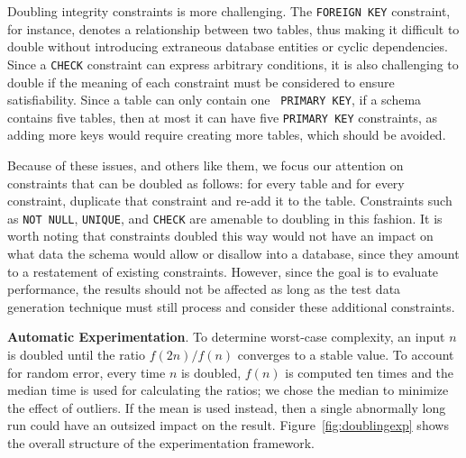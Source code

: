 

  Doubling integrity constraints is more challenging.  The {\tt FOREIGN KEY} constraint, for instance, denotes a relationship
  between two tables, thus making it difficult to double without introducing extraneous database entities or cyclic
  dependencies.  Since a {\tt CHECK} constraint can express arbitrary conditions, it is also challenging to double if the
  meaning of each constraint must be considered to ensure satisfiability.  Since a table can only contain one {\tt
  PRIMARY KEY}, if a schema contains five tables, then at most it can have five {\tt PRIMARY KEY} constraints, as adding more
  keys would require creating more tables, which should be avoided.




  Because of these issues, and others like them, we focus our attention on constraints that can be doubled as follows:
  for every table and for every constraint, duplicate that constraint and re-add it to the table.  Constraints such as
  {\tt NOT NULL}, {\tt UNIQUE}, and {\tt CHECK} are amenable to doubling in this fashion.  It is worth noting that
  constraints doubled this way would not have an impact on what data the schema would allow or disallow into a database,
  since they amount to a restatement of existing constraints.  However, since the goal is to evaluate performance, the
  results should not be affected as long as the test data generation technique must still process and consider these
  additional constraints.

  \textbf{Automatic Experimentation}. To determine worst-case complexity, an input $n$ is doubled until the ratio $f(2n)
  / f(n)$ converges to a stable value.  To account for random error, every time $n$ is doubled, $f(n)$ is computed ten
  times and the median time is used for calculating the ratios; we chose the median to minimize the effect of outliers.
  If the mean is used instead, then a single abnormally long run could have an outsized impact on the result.
  Figure~\ref{fig:doublingexp} shows the overall structure of the experimentation framework.

